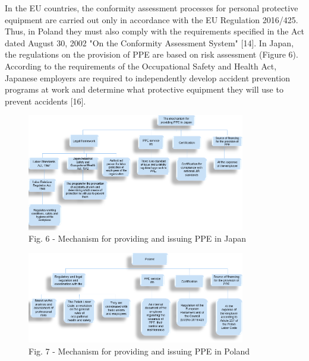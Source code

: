 \begin{multicols}{2}
In the EU countries, the conformity assessment processes for personal
protective equipment are carried out only in accordance with the EU
Regulation 2016/425. Thus, in Poland they must also comply with the
requirements specified in the Act dated August 30, 2002 "On the
Conformity Assessment System" {[}14{]}. In Japan, the regulations on the
provision of PPE are based on risk assessment (Figure 6). According to
the requirements of the Occupational Safety and Health Act, Japanese
employers are required to independently develop accident prevention
programs at work and determine what protective equipment they will use
to prevent accidents {[}16{]}.
\end{multicols}

\begin{figure}[H]
	\centering
	\includegraphics[width=0.85\textwidth]{media/chem2/image6}
	\caption*{Fig. 6 - Mechanism for providing and issuing PPE in Japan}
\end{figure}

\begin{figure}[H]
	\centering
	\includegraphics[width=0.85\textwidth]{media/chem2/image7}
	\caption*{Fig. 7 - Mechanism for providing and issuing PPE in Poland}
\end{figure}

